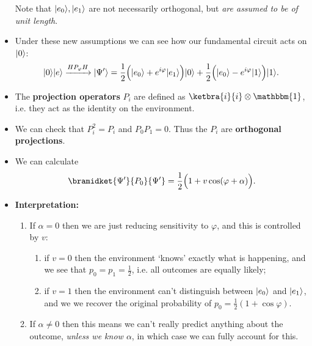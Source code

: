 \documentclass[10pt]{article}
\DeclarePairedDelimiter\ket{\lvert}{\rangle}
\begin{document}
\begin{itemize}
\begin{enumerate}
                \end{enumerate}
                Note that $\ket{e_0},\ket{e_1}$ are not necessarily orthogonal, but \emph{are assumed to be of unit length}.
            \item Under these new assumptions we can see how our fundamental circuit acts on $\ket{0}$:
                \begin{equation*}
                    \ket{0}\ket{e} \xrightarrow{HP_\varphi H} \ket{\Psi'}=\frac12\Big(\ket{e_0}+e^{i\varphi}\ket{e_1}\Big)\ket{0}+\frac12\Big(\ket{e_0}-e^{i\varphi}\ket{1}\Big)\ket{1}.
                \end{equation*}
            \item The \textbf{projection operators} $P_i$ are defined as $\ketbra{i}{i}\otimes\mathbbm{1}$, i.e. they act as the identity on the environment.
            \item We can check that $P_i^2=P_i$ and $P_0P_1=0$.
                Thus the $P_i$ are \textbf{orthogonal projections}.
            \item We can calculate
                \begin{equation*}
                    \bramidket{\Psi'}{P_0}{\Psi'} = \frac12\Big(1+v\cos(\varphi+\alpha)\Big).
                \end{equation*}
            \item \textbf{Interpretation:}
                \begin{enumerate}
                    \item If $\alpha=0$ then we are just reducing sensitivity to $\varphi$, and this is controlled by $v$:
                        \begin{enumerate}
                            \item if $v=0$ then the environment `knows' exactly what is happening, and we see that $p_0=p_1=\frac12$, i.e. all outcomes are equally likely;
                            \item if $v=1$ then the environment can't distinguish between $\ket{e_0}$ and $\ket{e_1}$, and we we recover the original probability of $p_0=\frac12(1+\cos\varphi)$.
                        \end{enumerate}
                    \item If $\alpha\neq0$ then this means we can't really predict anything about the outcome, \emph{unless we know $\alpha$}, in which case we can fully account for this.
                \end{enumerate}
        \end{itemize}
                
\end{document}
